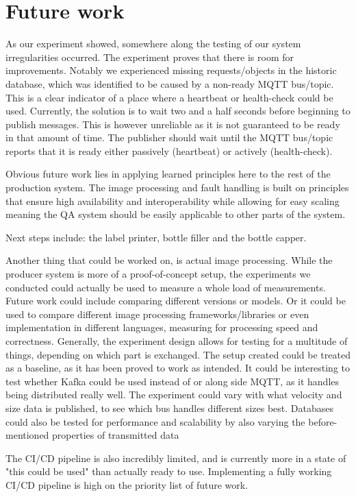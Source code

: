 \section{Future work}


As our experiment showed, somewhere along the testing of our system irregularities occurred. The experiment proves that there is room for improvements. Notably we experienced missing requests/objects in the historic database, which was identified to be caused by a non-ready MQTT bus/topic. This is a clear indicator of a place where a heartbeat or health-check could be used. Currently, the solution is to wait two and a half seconds before beginning to publish messages. This is however unreliable as it is not guaranteed to be ready in that amount of time. The publisher should wait until the MQTT bus/topic reports that it is ready either passively (heartbeat) or actively (health-check). 

Obvious future work lies in applying learned principles here to the rest of the production system. The image processing and fault handling is built on principles that ensure high availability and interoperability while allowing for easy scaling meaning the QA system should be easily applicable to other parts of the system. 

Next steps include: the label printer, bottle filler and the bottle capper. 

Another thing that could be worked on, is actual image processing. While the producer system is more of a proof-of-concept setup, the experiments we conducted could actually be used to measure a whole load of measurements. Future work could include comparing different versions or models. Or it could be used to compare different image processing frameworks/libraries or even implementation in different languages, measuring for processing speed and correctness. Generally, the experiment design allows for testing for a multitude of things, depending on which part is exchanged. The setup created could be treated as a baseline, as it has been proved to work as intended. It could be interesting to test whether Kafka could be used instead of or along side MQTT, as it handles being distributed really well. The experiment could vary with what velocity and size data is published, to see which bus handles different sizes best. Databases could also be tested for performance and scalability by also varying the before-mentioned properties of transmitted data   

The CI/CD pipeline is also incredibly limited, and is currently more in a state of "this could be used" than actually ready to use. Implementing a fully working CI/CD pipeline is high on the priority list of future work.

